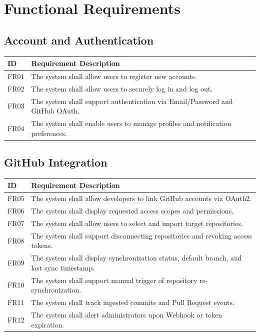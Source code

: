 \section{Functional Requirements}

\subsection{Account and Authentication}
\begin{longtable}{p{2cm} p{11.3cm}}
	\toprule
	\textbf{ID} & \textbf{Requirement Description} \\
	\midrule
	\endhead
	FR01 & The system shall allow users to register new accounts. \\
	FR02 & The system shall allow users to securely log in and log out. \\
	FR03 & The system shall support authentication via Email/Password and GitHub OAuth. \\
	FR04 & The system shall enable users to manage profiles and notification preferences. \\
	\bottomrule
\end{longtable}

\subsection{GitHub Integration}
\begin{longtable}{p{2cm} p{11.3cm}}
	\toprule
	\textbf{ID} & \textbf{Requirement Description} \\
	\midrule
	\endhead
	FR05 & The system shall allow developers to link GitHub accounts via OAuth2. \\
	FR06 & The system shall display requested access scopes and permissions. \\
	FR07 & The system shall allow users to select and import target repositories. \\
	FR08 & The system shall support disconnecting repositories and revoking access tokens. \\
	FR09 & The system shall display synchronization status, default branch, and last sync timestamp. \\
	FR10 & The system shall support manual trigger of repository re-synchronization. \\
	FR11 & The system shall track ingested commits and Pull Request events. \\
	FR12 & The system shall alert administrators upon Webhook or token expiration. \\
	\bottomrule
\end{longtable}

